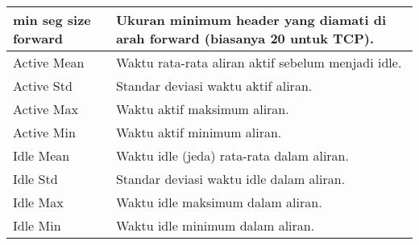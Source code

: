 \documentclass[a4paper,12pt]{report}
\begin{document}
\begin{table}[h!]
\begin{longtable}{|p{3cm} | p{10cm} |}
		\hline
		min seg size forward & Ukuran minimum header yang diamati di arah forward (biasanya 20 untuk TCP). \\
		\hline
		Active Mean & Waktu rata-rata aliran aktif sebelum menjadi idle. \\
		\hline
		Active Std & Standar deviasi waktu aktif aliran. \\
		\hline
		Active Max & Waktu aktif maksimum aliran. \\
		\hline
		Active Min & Waktu aktif minimum aliran. \\
		\hline
		Idle Mean & Waktu idle (jeda) rata-rata dalam aliran. \\
		\hline
		Idle Std & Standar deviasi waktu idle dalam aliran. \\
		\hline
		Idle Max & Waktu idle maksimum dalam aliran. \\
		\hline
		Idle Min & Waktu idle minimum dalam aliran. \\
		\hline
	\end{longtable}
\end{table}
\end{document}
